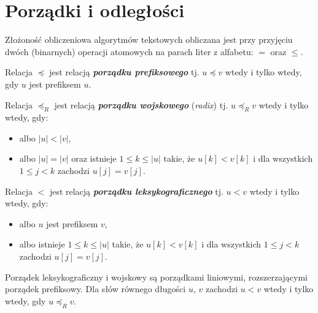 \section{Porządki i odległości}

Złożoność obliczeniowa algorytmów tekstowych obliczana jest przy przyjęciu dwóch (binarnych) operacji atomowych na parach liter z alfabetu: $=$ oraz $\le$.

\begin{definition}{}{}
  Relacja $\preceq$ jest relacją \textbf{\textit{porządku prefiksowego}} tj. $u \preceq v$ wtedy i tylko wtedy, gdy $u$ jest prefiksem $u$.
\end{definition}

\begin{definition}{}{}
  Relacja $\preceq_R$ jest relacją \textbf{\textit{porządku wojskowego}} (\emph{radix}) tj. $u \preceq_R v$ wtedy i tylko wtedy, gdy:
  \begin{itemize}
    \item albo $|u| < |v|$,
    \item albo $|u| = |v|$ oraz istnieje $1 \le k \le |u|$ takie, że $u[k] < v[k]$ i dla wszystkich $1 \le j < k$ zachodzi $u[j] = v[j]$.
  \end{itemize}
\end{definition}

\begin{definition}{}{}
  Relacja $<$ jest relacją \textbf{\textit{porządku leksykograficznego}} tj. $u < v$ wtedy i tylko wtedy, gdy:
  \begin{itemize}
    \item albo $u$ jest prefiksem $v$,
    \item albo istnieje $1 \le k \le |u|$ takie, że $u[k] < v[k]$ i dla wszystkich $1 \le j < k$ zachodzi $u[j] = v[j]$.
  \end{itemize}
\end{definition}

\begin{corollary}{}{}
  Porządek leksykograficzny i wojskowy są porządkami liniowymi, rozszerzającymi porządek prefiksowy. Dla słów równego długości $u$, $v$ zachodzi $u < v$ wtedy i tylko wtedy, gdy $u \preceq_R v$.
\end{corollary}
